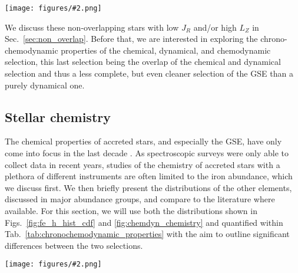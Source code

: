 \documentclass[fleqn,usenatbib]{mnras}
\newcommand{\codeicon}{{\faCloudDownload}}
\newcommand{\codelink}[1]{\href{https://github.com/svenbuder/Accreted-stars-in-GALAH-DR3/tree/main/figures/#1.ipynb}{\codeicon}\,\,}
\newcommand{\oscaption}[2]{\caption{#2 \codelink{#1}}}
\newcommand{\figuretextwidth}[4]{\begin{figure*} \centering \texttt{[image: figures/\#2.png]}\oscaption{#3}{#4}\label{fig:#2} \end{figure*}}
\begin{document}
\figuretextwidth{17cm}{fe_h_hist_cdf}{chronochemodynamic_comparison}{
\textbf{Relative (top panels) and cumulative (bottom panels) distribution of iron abundances [Fe/H] for our samples of accreted stars.} \textbf{Left panels a and c} show chemically selected accreted stars and compare with the results by \citet{Das2020}.
\textbf{Right panels b and d} show the dynamical selections of the GSE by our work and \citet{Feuillet2020, Feuillet2021} as well as \citet{Naidu2020}.
}

We discuss these non-overlapping stars with low $J_R$ and/or high $L_Z$ in Sec.~\ref{sec:non_overlap}. Before that, we are interested in exploring the chrono-chemodynamic properties of the chemical, dynamical, and chemodynamic selection, this last selection being the overlap of the chemical and dynamical selection and thus a less complete, but even cleaner selection of the GSE than a purely dynamical one.

\subsection{Stellar chemistry} \label{sec:gse_stellar_chemistry}

The chemical properties of accreted stars, and especially the GSE, have only come into focus in the last decade \citep{Nissen2018,Helmi2020}. As spectroscopic surveys were only able to collect data in recent years, studies of the chemistry of accreted stars with a plethora of different instruments are often limited to the iron abundance, which we discuss first. We then briefly present the distributions of the other elements, discussed in major abundance groups, and compare to the literature where available. For this section, we will use both the distributions shown in Figs.~\ref{fig:fe_h_hist_cdf} and \ref{fig:chemdyn_chemistry} and quantified within Tab.~\ref{tab:chronochemodynamic_properties} with the aim to outline significant differences between the two selections.

\figuretextwidth{17cm}{chemdyn_chemistry}{chronochemodynamic_comparison}{
\textbf{Abundance distributions [X/Fe] (and absolute abundance for Li) as a function of iron abundance [Fe/H] for elements X (noted in each panel).} Shown are the distributions of all GALAH+ DR3 stars (black contours) as well as those of the chemically selected (orange contours) and dynamically selected (red contours) accreted stars. Quantities of each distributions are listed in Tab.~\ref{tab:chronochemodynamic_properties} together with the distribution of the stars within both the chemical and dynamical selection.
}
\end{document}
